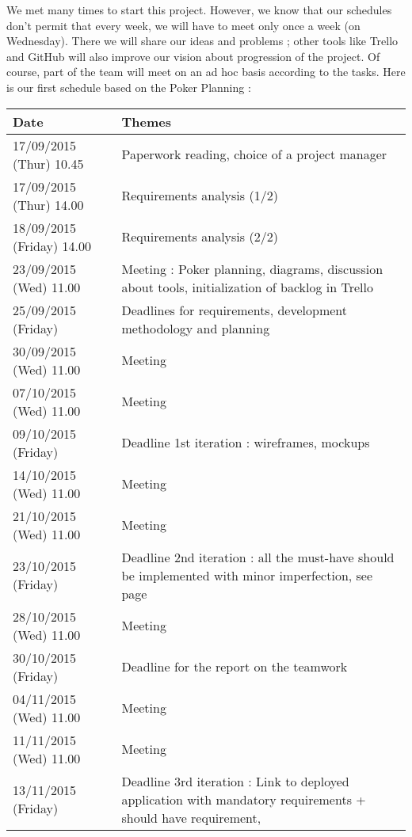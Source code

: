 We met many times to start this project. However, we know that our
schedules don't permit that every week, we will have to meet only once a
week (on Wednesday). There we will share our ideas and problems ;
other tools like Trello and GitHub will also improve our vision about
progression of the project. Of course, part of the team will meet on an ad
hoc basis according to the tasks. Here is our first schedule based on
the Poker Planning : \newline

\noindent\begin{longtable}{|p{0.275\linewidth}|p{0.725\linewidth}|}
    \hline
    Date & Themes \\
    \hline
    \hline
    17/09/2015 (Thur) 10.45 & Paperwork reading, choice of a project
    manager \\
    \hline
    17/09/2015 (Thur) 14.00 & Requirements analysis (1/2) \\
    \hline
    18/09/2015 (Friday) 14.00 & Requirements analysis (2/2) \\
    \hline
    23/09/2015 (Wed) 11.00 & Meeting : Poker planning, diagrams,
    discussion about tools, initialization of backlog in Trello \\
    \hline
    25/09/2015 (Friday) & Deadlines for requirements, development methodology
    and planning \\
    \hline
    30/09/2015 (Wed) 11.00 & Meeting \\
    \hline
    07/10/2015 (Wed) 11.00 & Meeting \\
    \hline
    09/10/2015 (Friday) & Deadline 1st iteration : wireframes, mockups \\
    \hline
    14/10/2015 (Wed) 11.00 & Meeting \\
    \hline
    21/10/2015 (Wed) 11.00 & Meeting \\
    \hline
    23/10/2015 (Friday) & Deadline 2nd iteration : all the must-have
    should be implemented with minor imperfection, see
    page~\pageref{musthave} \\
    \hline
    28/10/2015 (Wed) 11.00 & Meeting \\
    \hline
    30/10/2015 (Friday) & Deadline for the report on the teamwork \\
    \hline
    04/11/2015 (Wed) 11.00 & Meeting \\
    \hline
    11/11/2015 (Wed) 11.00 & Meeting \\
    \hline
    13/11/2015 (Friday) & Deadline 3rd iteration : Link to deployed
    application with mandatory requirements + should have requirement,

\end{longtable}
